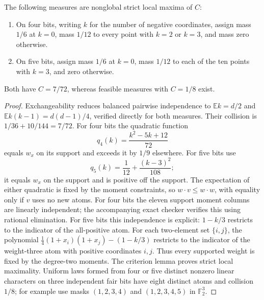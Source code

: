 \begin{theorem}
\label{thm:attainment-small-traps}
The following measures are nonglobal strict local maxima of $C$:
\begin{enumerate}
\item On four bits, writing $k$ for the number of negative coordinates,
assign mass $1/6$ at $k=0$, mass $1/12$ to every point with $k=2$ or
$k=3$, and mass zero otherwise.
\item On five bits, assign mass $1/6$ at $k=0$, mass $1/12$ to each
of the ten points with $k=3$, and zero otherwise.
\end{enumerate}
Both have $C=7/72$, whereas feasible measures with $C=1/8$ exist.
\end{theorem}
\begin{proof}
Exchangeability reduces balanced pairwise independence to
$\mathbb E k=d/2$ and $\mathbb E k(k-1)=d(d-1)/4$, verified directly
for both measures. Their collision is $1/36+10/144=7/72$.
For four bits the quadratic function
\[
 q_4(k)=\frac{k^2-5k+12}{72}
\]
equals $w_x$ on its support and exceeds it by $1/9$ elsewhere.
For five bits use
\[
 q_5(k)=\frac1{12}+\frac{(k-3)^2}{108};
\]
it equals $w_x$ on the support and is positive off the support.
The expectation of either quadratic is fixed by the moment constraints,
so $w\cdot v\le w\cdot w$, with equality only if $v$ uses no new atoms.
For four bits the eleven support moment columns are linearly independent;
the accompanying exact checker verifies this using rational elimination.
For five bits this independence is explicit: $1-k/3$ restricts to the
indicator of the all-positive atom. For each two-element set $\{i,j\}$,
the polynomial $\frac14(1+x_i)(1+x_j)-(1-k/3)$ restricts to the
indicator of the weight-three atom with positive coordinates $i,j$.
Thus every supported weight is fixed by the degree-two moments.
The criterion lemma proves strict local maximality. Uniform laws formed
from four or five distinct nonzero linear characters on three independent
fair bits have eight distinct atoms and collision $1/8$; for example
use masks $(1,2,3,4)$ and $(1,2,3,4,5)$ in $\mathbb F_2^3$.
\end{proof}

